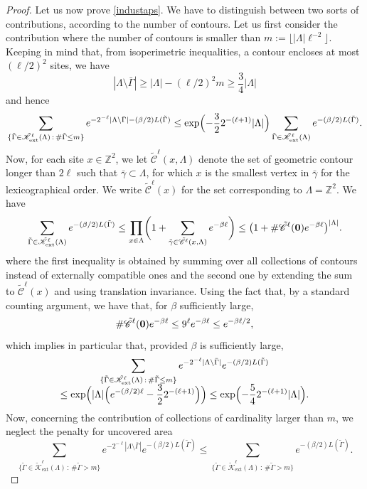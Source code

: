 \documentclass[10pt]{amsart}
\let\mathcal\mathscr
\newcommand{\sep}{\,:\,}
\numberwithin{equation}{section}
\theoremstyle{plain}
\theoremstyle{definition}
\newcommand{\ext}{\mathrm{ext}}
\newcommand{\cC}{{\ensuremath{\mathcal C}} }
\newcommand{\cK}{{\ensuremath{\mathcal K}} }
\newcommand{\bbZ}{{\ensuremath{\mathbb Z}} }
\newcommand{\gb}{\beta}
\newcommand{\gG}{\Gamma}
\newcommand{\gL}{\Lambda}
\begin{document}
\begin{proof}
Let us now prove \eqref{industaps}.
We have to distinguish between two sorts of contributions, according to the number of contours.
Let us first consider the contribution where the number of contours is smaller than $m:=\lfloor |\gL|\ell^{-2} \rfloor$.
Keeping in mind that, from isoperimetric inequalities, a contour encloses at most $(\ell/2)^2$ sites, we have
\[
|\gL\setminus \bar \gG|\ge |\gL|-(\ell/2)^2m \ge \frac{3}{4}|\gL|
\]
and hence
\begin{equation*}
\sum_{\{ \tilde \gG\in \tilde \cK^{\ell}_{\ext}(\gL)\sep \# \tilde \gG \le m \}} e^{-2^{-\ell} |\gL\setminus \bar \gG|-(\gb/2) L(\tilde\gG)}
\le \exp\Bigl(-\frac{3}{2} 2^{-(\ell+1)}|\gL|\Bigr) \sum_{\tilde \gG\in \tilde \cK^{\ell}_{\ext}(\gL)}e^{-(\gb/2)L(\tilde\gG)}.
\end{equation*}
Now, for each site $x\in \bbZ^2$, we let $\tilde\cC^{\ell}(x,\gL)$ denote the set of geometric contour longer than $2\ell$ such that
$\bar \gamma \subset \gL$, for which $x$ is the
smallest vertex in $\bar \gamma$ for the lexicographical order. We write $\tilde\cC^{\ell}(x)$ for the set corresponding to $\gL=\bbZ^2$.
We have
\begin{equation*}
\sum_{\tilde \gG\in \tilde \cK^{\ell}_{\ext}(\gL)}e^{-(\gb/2) L(\tilde\gG)}
\le \prod_{x\in \gL} \biggl(1+\sum_{\tilde \gamma \in \tilde\cC^{\ell}(x,\gL)} e^{-\gb\ell}\biggr) \le
\bigl(1+\#\tilde\cC^{\ell}({\bf 0}) e^{-\gb\ell}\bigr)^{|\gL|}.
\end{equation*}
where the first inequality is obtained by summing over all collections of contours instead of externally compatible ones and
the second one by extending the sum to $\tilde\cC^{\ell}(x)$ and using translation invariance.
Using the fact that, by a standard counting argument, we have that, for $\gb$ sufficiently large,
\[
\#\tilde\cC^{\ell}({\bf 0}) e^{-\gb\ell}\le 9^{\ell} e^{-\gb\ell}\le e^{-\gb\ell /2},
\]
which implies in particular that, provided $\gb$ is sufficiently large,
\begin{multline}\label{zapi}
\sum_{\{ \tilde \gG\in \tilde \cK^{\ell}_{\ext}(\gL)\sep \# \tilde \gG \le m \}} e^{-2^{-\ell} |\gL\setminus \bar \gG|}e^{-(\gb/2) L(\tilde\gG)}
\\[-5pt] \le \exp\Bigl(|\gL|\Bigl(e^{-(\gb /2) \ell}-\frac{3}{2} 2^{-(\ell+1)}\Bigr) \Bigr)\le \exp\Bigl(-\frac{5}{4}2^{-(\ell+1)} |\gL|\Bigr).
\end{multline}
Now, concerning the contribution of collections of cardinality larger than $m$, we neglect the penalty for uncovered area
\begin{equation*}
\sum_{\{ \tilde \gG\in \tilde \cK^{\ell}_{\ext}(\gL)\sep \# \tilde \gG > m \}} e^{-2^{-\ell} |\gL\setminus \bar \gG|}e^{-(\gb/2) L(\tilde\gG)}
\le \sum_{\{ \tilde \gG\in \tilde \cK^{\ell}_{\ext}(\gL)\sep \# \tilde \gG > m \}} e^{-(\gb/2) L(\tilde\gG)}.
\end{equation*}


\end{proof}
\end{document}
